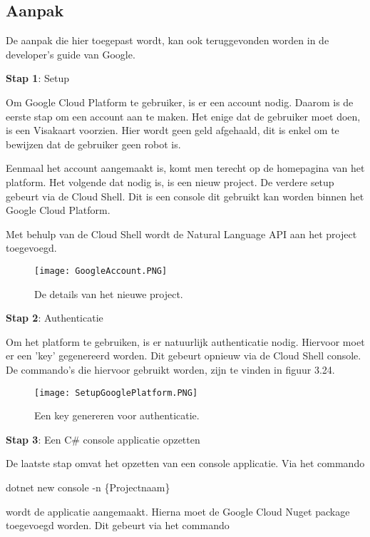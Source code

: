 \subsection{Aanpak}
\label{aanpakgoogleplatform}

De aanpak die hier toegepast wordt, kan ook teruggevonden worden in de developer's guide van Google. \autocite{Codelabs2021}

\textbf{Stap 1}: Setup

Om Google Cloud Platform te gebruiker, is er een account nodig. Daarom is de eerste stap om een account aan te maken. Het enige dat de gebruiker moet doen, is een Visakaart voorzien. Hier wordt geen geld afgehaald, dit is enkel om te bewijzen dat de gebruiker geen robot is. 

Eenmaal het account aangemaakt is, komt men terecht op de homepagina van het platform. Het volgende dat nodig is, is een nieuw project. De verdere setup gebeurt via de Cloud Shell. Dit is een console dit gebruikt kan worden binnen het Google Cloud Platform. 

Met behulp van de Cloud Shell wordt de Natural Language API aan het project toegevoegd. 

\begin{figure}[!htbp]
    \texttt{[image: GoogleAccount.PNG]}
    \caption{\label{googleaccount}De details van het nieuwe project.}
\end{figure}
\FloatBarrier 

\textbf{Stap 2}: Authenticatie

Om het platform te gebruiken, is er natuurlijk authenticatie nodig. Hiervoor moet er een 'key' gegenereerd worden. Dit gebeurt opnieuw via de Cloud Shell console. De commando's die hiervoor gebruikt worden, zijn te vinden in figuur 3.24.

\begin{figure}[!htbp]
    \texttt{[image: SetupGooglePlatform.PNG]}
    \caption{\label{setupgoogleplatform}Een key genereren voor authenticatie.}
\end{figure}
\FloatBarrier 

\textbf{Stap 3}: Een C\# console applicatie opzetten

De laatste stap omvat het opzetten van een console applicatie. Via het commando 

dotnet new console -n \{Projectnaam\} 

wordt de applicatie aangemaakt. Hierna moet de Google Cloud Nuget package toegevoegd worden. Dit gebeurt via het commando

